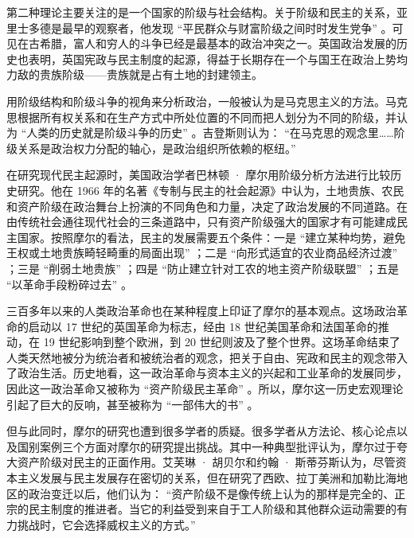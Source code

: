 
第二种理论主要关注的是一个国家的阶级与社会结构。关于阶级和民主的关系，亚里士多德是最早的观察者，他发现 “平民群众与财富阶级之间时时发生党争” 。可见在古希腊，富人和穷人的斗争已经是最基本的政治冲突之一。英国政治发展的历史也表明，英国宪政与民主制度的起源，得益于长期存在一个与国王在政治上势均力敌的贵族阶级——贵族就是占有土地的封建领主。

用阶级结构和阶级斗争的视角来分析政治，一般被认为是马克思主义的方法。马克思根据所有权关系和在生产方式中所处位置的不同而把人划分为不同的阶级，并认为 “人类的历史就是阶级斗争的历史” 。吉登斯则认为： “在马克思的观念里……阶级关系是政治权力分配的轴心，是政治组织所依赖的枢纽。” 

在研究现代民主起源时，美国政治学者巴林顿 · 摩尔用阶级分析方法进行比较历史研究。他在 1966 年的名著《专制与民主的社会起源》中认为，土地贵族、农民和资产阶级在政治舞台上扮演的不同角色和力量，决定了政治发展的不同道路。在由传统社会通往现代社会的三条道路中，只有资产阶级强大的国家才有可能建成民主国家。按照摩尔的看法，民主的发展需要五个条件：一是 “建立某种均势，避免王权或土地贵族畸轻畸重的局面出现” ；二是 “向形式适宜的农业商品经济过渡” ；三是 “削弱土地贵族” ；四是 “防止建立针对工农的地主资产阶级联盟” ；五是 “以革命手段粉碎过去” 。

三百多年以来的人类政治革命也在某种程度上印证了摩尔的基本观点。这场政治革命的启动以 17 世纪的英国革命为标志，经由 18 世纪美国革命和法国革命的推动，在 19 世纪影响到整个欧洲，到 20 世纪则波及了整个世界。这场革命结束了人类天然地被分为统治者和被统治者的观念，把关于自由、宪政和民主的观念带入了政治生活。历史地看，这一政治革命与资本主义的兴起和工业革命的发展同步，因此这一政治革命又被称为 “资产阶级民主革命” 。所以，摩尔这一历史宏观理论引起了巨大的反响，甚至被称为 “一部伟大的书” 。

但与此同时，摩尔的研究也遭到很多学者的质疑。很多学者从方法论、核心论点以及国别案例三个方面对摩尔的研究提出挑战。其中一种典型批评认为，摩尔过于夸大资产阶级对民主的正面作用。艾芙琳 · 胡贝尔和约翰 · 斯蒂芬斯认为，尽管资本主义发展与民主发展存在密切的关系，但在研究了西欧、拉丁美洲和加勒比海地区的政治变迁以后，他们认为： “资产阶级不是像传统上认为的那样是完全的、正宗的民主制度的推进者。当它的利益受到来自于工人阶级和其他群众运动需要的有力挑战时，它会选择威权主义的方式。” 

